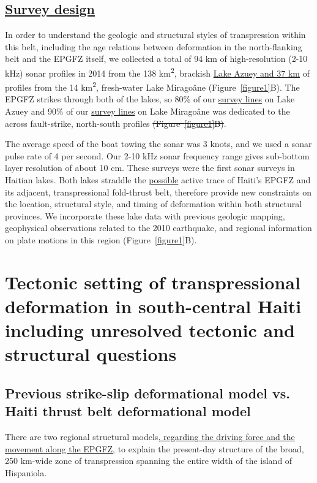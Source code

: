 \documentclass[linenumbers,draft]{agujournal}
\begin{document}
\subsection{\ul{Survey design}}
In order to understand the geologic and structural styles of transpression within this belt, including the age relations between deformation in the north-flanking belt and the EPGFZ itself, we collected a total of 94 km of high-resolution (2-10 kHz) sonar profiles in 2014 from the 138 km\textsuperscript{2}, brackish \ul{Lake Azuey and 37 km} of profiles from the 14 km\textsuperscript{2}, fresh-water Lake Mirago\^ane (Figure~\ref{figure1}B). The EPGFZ strikes through both of the lakes, so 80\% of our \ul{survey lines} on Lake Azuey and 90\% of our \ul{survey lines} on Lake Mirago\^ane was dedicated to the across fault-strike, north-south profiles \st{(Figure~{\ref{figure1}}B)}. 

The average speed of the boat towing the sonar was 3 knots, and we used a sonar pulse rate of 4 per second. Our 2-10 kHz sonar frequency range gives sub-bottom layer resolution of about 10 cm. These surveys were the first sonar surveys in Haitian lakes. Both lakes straddle the \ul{possible} active trace of Haiti's EPGFZ and its adjacent, transpressional fold-thrust belt, therefore provide new constraints on the location, structural style, and timing of deformation within both structural provinces. We incorporate these lake data with previous geologic mapping, geophysical observations related to the 2010 earthquake, and regional information on plate motions in this region (Figure~\ref{figure1}B). 

\section{Tectonic setting of transpressional deformation in south-central Haiti including unresolved tectonic and structural questions}
\label{sec:tectonic}
\subsection{Previous strike-slip deformational model vs. Haiti thrust belt deformational model}
There are two regional structural models\ul{, regarding the driving force and the movement along the EPGFZ,} to explain the present-day structure of the broad, 250 km-wide zone of transpression spanning the entire width of the island of Hispaniola.
\end{document}
